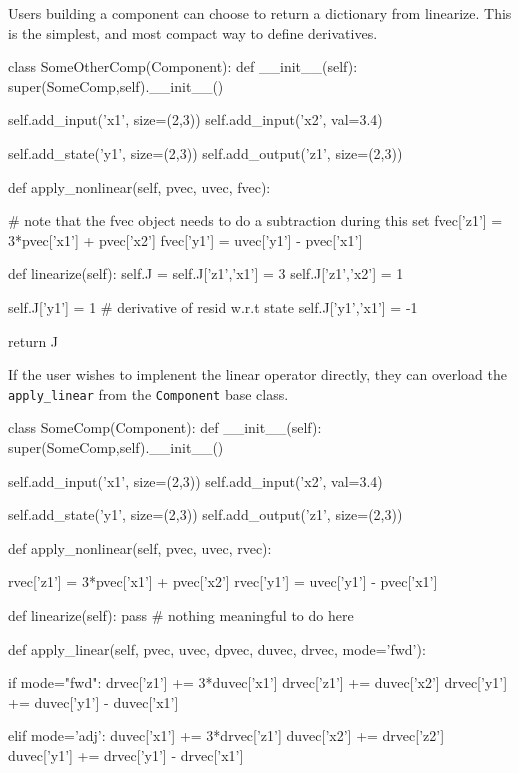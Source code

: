 \documentclass[12pt]{article}
\newcommand{\classname}[1]{\texttt{#1}}
\newcommand{\method}[1]{\texttt{#1}}
\begin{document}
Users building a component can choose to return a dictionary from linearize.
This is the simplest, and most compact way to define derivatives.

\begin{pyglist}[language=python]
    class SomeOtherComp(Component):
        def __init__(self):
            super(SomeComp,self).__init__()

            self.add_input('x1', size=(2,3))
            self.add_input('x2', val=3.4)

            self.add_state('y1', size=(2,3))
            self.add_output('z1', size=(2,3))

        def apply_nonlinear(self, pvec, uvec, fvec):

            # note that the fvec object needs to do a subtraction during this set
            fvec['z1'] = 3*pvec['x1'] + pvec['x2']
            fvec['y1'] = uvec['y1'] - pvec['x1']

        def linearize(self):
            self.J = {}
            self.J['z1','x1'] = 3
            self.J['z1','x2'] = 1

            self.J['y1'] = 1 # derivative of resid w.r.t state
            self.J['y1','x1'] = -1

            return J
\end{pyglist}

If the user wishes to implenent the linear operator directly, they can overload
the \method{apply\_linear} from the \classname{Component} base class.

\begin{pyglist}[language=python]
    class SomeComp(Component):
        def __init__(self):
            super(SomeComp,self).__init__()

            self.add_input('x1', size=(2,3))
            self.add_input('x2', val=3.4)

            self.add_state('y1', size=(2,3))
            self.add_output('z1', size=(2,3))

        def apply_nonlinear(self, pvec, uvec, rvec):

            rvec['z1'] = 3*pvec['x1'] + pvec['x2']
            rvec['y1'] = uvec['y1'] - pvec['x1']

        def linearize(self):
            pass # nothing meaningful to do here

        def apply_linear(self, pvec, uvec, dpvec, duvec, drvec, mode='fwd'):

            if mode="fwd":
                drvec['z1'] += 3*duvec['x1']
                drvec['z1'] += duvec['x2']
                drvec['y1'] += duvec['y1'] - duvec['x1']

            elif mode='adj':
                duvec['x1'] += 3*drvec['z1']
                duvec['x2'] += drvec['z2']
                duvec['y1'] += drvec['y1'] - drvec['x1']
\end{pyglist}
\end{document}
